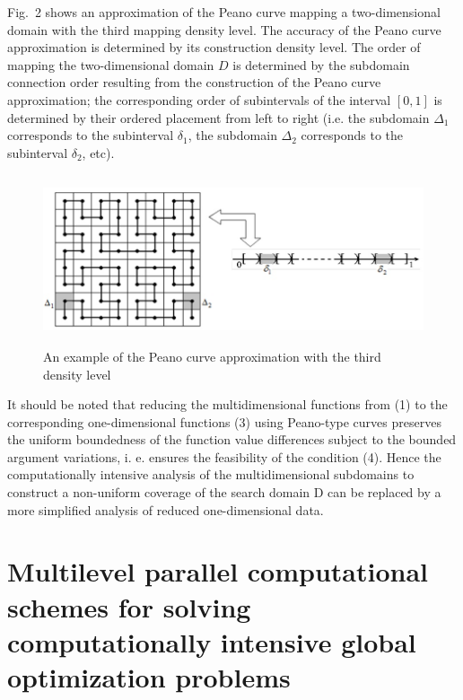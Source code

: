 \documentclass[
11pt,%
tightenlines,%
twoside,%
onecolumn,%
nofloats,%
nobibnotes,%
nofootinbib,%
superscriptaddress,%
noshowpacs,%
centertags]%
{revtex4}
\begin{document}
Fig.~2 shows an approximation of the Peano curve mapping a two-dimensional domain with the third mapping density level. The accuracy of the Peano curve approximation is determined by its construction density level. The order of mapping the two-dimensional domain $D$ is determined by the subdomain connection order resulting from the construction of the Peano curve approximation; the corresponding order of subintervals of the interval $[0, 1]$ is determined by their ordered placement from left to right (i.e. the subdomain $\Delta_1$ corresponds to the subinterval $\delta_1$, the subdomain $\Delta_2$ corresponds to the subinterval $\delta_2$, etc).

\begin{figure}
\centering
\includegraphics[height=5.0cm]{Fig2}
\caption{An example of the Peano curve approximation with the third density level}
\label{fig:Fig2}
\end{figure}

It should be noted that reducing the multidimensional functions from (1) to the corresponding one-dimensional functions (3) using Peano-type curves preserves the uniform boundedness of the function value differences subject to the bounded argument variations, i. e. ensures the feasibility of the condition (4). Hence the computationally intensive analysis of the multidimensional subdomains to construct a non-uniform coverage of the search domain D can be replaced by a more simplified analysis of reduced one-dimensional data.


\section{Multilevel parallel computational schemes for solving computationally intensive global optimization problems}
\end{document}
